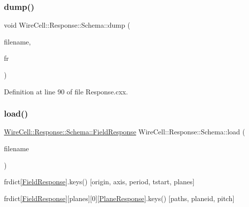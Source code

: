 \subsubsection{\texorpdfstring{dump()}{dump()}}
{\footnotesize\ttfamily void Wire\+Cell\+::\+Response\+::\+Schema\+::dump (\begin{DoxyParamCaption}\item[{const char $\ast$}]{filename,  }\item[{const \hyperlink{struct_wire_cell_1_1_response_1_1_schema_1_1_field_response}{Field\+Response} \&}]{fr }\end{DoxyParamCaption})}



Definition at line 90 of file Response.\+cxx.

\mbox{\label{namespace_wire_cell_1_1_response_1_1_schema_a4b86873ce3e615148bc29b75b74bab9c}} 
\subsubsection{\texorpdfstring{load()}{load()}}
{\footnotesize\ttfamily \hyperlink{struct_wire_cell_1_1_response_1_1_schema_1_1_field_response}{Wire\+Cell\+::\+Response\+::\+Schema\+::\+Field\+Response} Wire\+Cell\+::\+Response\+::\+Schema\+::load (\begin{DoxyParamCaption}\item[{const char $\ast$}]{filename }\end{DoxyParamCaption})}

frdict\mbox{[}\textquotesingle{}\hyperlink{struct_wire_cell_1_1_response_1_1_schema_1_1_field_response}{Field\+Response}\textquotesingle{}\mbox{]}.keys() \mbox{[}\textquotesingle{}origin\textquotesingle{}, \textquotesingle{}axis\textquotesingle{}, \textquotesingle{}period\textquotesingle{}, \textquotesingle{}tstart\textquotesingle{}, \textquotesingle{}planes\textquotesingle{}\mbox{]}

frdict\mbox{[}\textquotesingle{}\hyperlink{struct_wire_cell_1_1_response_1_1_schema_1_1_field_response}{Field\+Response}\textquotesingle{}\mbox{]}\mbox{[}\textquotesingle{}planes\textquotesingle{}\mbox{]}\mbox{[}0\mbox{]}\mbox{[}\textquotesingle{}\hyperlink{struct_wire_cell_1_1_response_1_1_schema_1_1_plane_response}{Plane\+Response}\textquotesingle{}\mbox{]}.keys() \mbox{[}\textquotesingle{}paths\textquotesingle{}, \textquotesingle{}planeid\textquotesingle{}, \textquotesingle{}pitch\textquotesingle{}\mbox{]}

